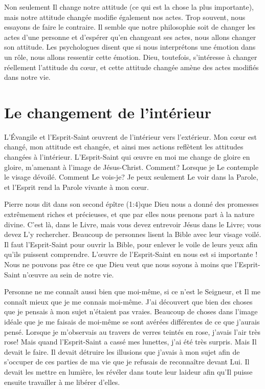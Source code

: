 Non seulement Il change notre attitude (ce qui est la chose la plus importante),
 mais notre attitude changée modifie également nos actes.
 Trop souvent, nous essayons de faire le contraire.
 Il semble que notre philosophie soit de changer les actes d'une personne
 et d'espérer qu'en changeant ses actes, nous allons changer son attitude.
 Les psychologues disent que si nous interprétons une émotion dans un rôle, nous allons ressentir
 cette émotion.
 Dieu, toutefois, s'intéresse à changer réellement l'attitude du cœur,
 et cette attitude changée amène des actes modifiés dans notre vie.


\section{Le changement de l'int\'erieur}

L'Évangile et l'Esprit-Saint œuvrent de l'intérieur vers l'exté\-rieur.
 Mon cœur est changé, mon attitude est changée,
 et ainsi mes actions reflètent les attitudes changées à l'intérieur.
 L'Esprit-Saint qui œuvre en moi me change de gloire en gloire,
 m'amenant à l'image de Jésus-Christ. Comment?
 Lorsque je Le contemple le visage dévoilé.
 Comment Le vois-je? Je peux seulement Le voir dans la Parole,
 et l'Esprit rend la Parole vivante à mon cœur.

Pierre nous dit dans son second épître
 (1:4)que Dieu nous a donné
 des promesses extrêmement riches et précieuses,
 et que par elles nous prenons part à la nature divine.
 C'est là, dans le Livre, mais vous devez entrevoir Jésus dans le Livre;
 vous devez L'y rechercher.
 Beaucoup de personnes lisent la Bible avec leur visage voilé.
 Il faut l'Esprit-Saint pour ouvrir la Bible, pour enlever le voile
 de leurs yeux afin qu'ils puissent comprendre.
 L'œuvre de l'Esprit-Saint en nous est si importante !
 Nous ne pouvons pas être ce que Dieu veut que nous soyons
 à moins que l'Esprit-Saint n'\oe{}uvre au sein de notre vie.

Personne ne me connaît aussi bien que moi-même, si ce n'est le Seigneur,
 et Il me connaît mieux que je me connais moi-même.
 J'ai découvert que bien des choses que je pensais
 à mon sujet n'étaient pas vraies.
 Beaucoup de choses dans l'image idéale que je me faisais de moi-même
 se sont avérées différentes de ce que j'aurais pensé.
 Lorsque je m'observais au travers de verres teintés en rose,
 j'avais l'air très rose!
 Mais quand l'Esprit-Saint a cassé mes lunettes,
 j'ai été très surpris. Mais Il devait le faire.
 Il devait détruire les illusions que j'avais à mon sujet afin de s'occuper
 de ces parties de ma vie que je refusais de reconnaître devant Lui.
 Il devait les mettre en lumière, les révéler dans toute leur laideur
 afin qu'Il puisse ensuite travailler à me libérer d'elles.


